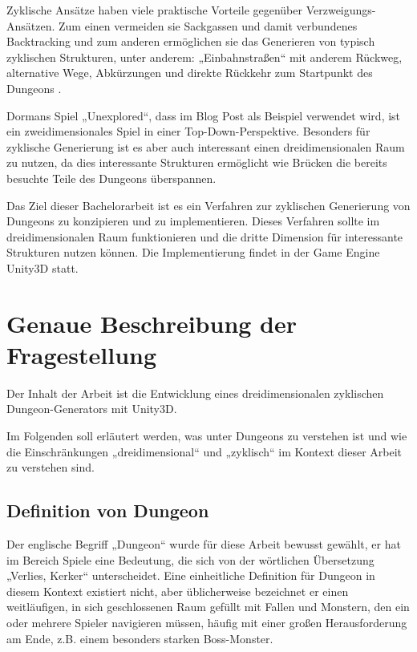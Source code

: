 Zyklische Ansätze haben viele praktische Vorteile gegenüber Verzweigungs-Ansätzen. Zum einen vermeiden sie Sackgassen und damit verbundenes Backtracking und zum anderen ermöglichen sie das Generieren von typisch zyklischen Strukturen, unter anderem: „Einbahnstraßen“ mit anderem Rückweg, alternative Wege, Abkürzungen und direkte Rückkehr zum Startpunkt des Dungeons 
\cite{blogCyclic}.

Dormans Spiel „Unexplored“, dass im Blog Post als Beispiel verwendet wird, ist ein zweidimensionales Spiel in einer Top-Down-Perspektive. Besonders für zyklische Generierung ist es aber auch interessant einen dreidimensionalen Raum zu nutzen, da dies interessante Strukturen ermöglicht wie Brücken die bereits besuchte Teile des Dungeons überspannen.  

Das Ziel dieser Bachelorarbeit ist es ein Verfahren zur zyklischen Generierung von Dungeons zu konzipieren und zu implementieren. Dieses Verfahren sollte im dreidimensionalen Raum funktionieren und die dritte Dimension für interessante Strukturen nutzen können. Die Implementierung findet in der Game Engine Unity3D statt.



\section{Genaue Beschreibung der Fragestellung}

Der Inhalt der Arbeit ist die Entwicklung eines dreidimensionalen zyklischen Dungeon-Generators mit Unity3D. 

Im Folgenden soll erläutert werden, was unter Dungeons zu verstehen ist und wie die Einschränkungen „dreidimensional“ und „zyklisch“ im Kontext dieser Arbeit zu verstehen sind.

\subsection{Definition von Dungeon}

Der englische Begriff „Dungeon“ wurde für diese Arbeit bewusst gewählt, er hat im Bereich Spiele eine Bedeutung, die sich von der wörtlichen Übersetzung „Verlies, Kerker“ unterscheidet. Eine einheitliche Definition für Dungeon in diesem Kontext existiert nicht, aber üblicherweise bezeichnet er einen weitläufigen, in sich geschlossenen Raum gefüllt mit Fallen und Monstern, den ein oder mehrere Spieler navigieren müssen, häufig mit einer großen Herausforderung am Ende, z.B. einem besonders starken Boss-Monster.


